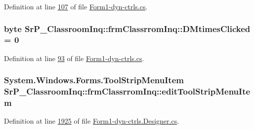 \-Definition at line \hyperlink{_form1-dyn-ctrls_8cs_source_l00107}{107} of file \hyperlink{_form1-dyn-ctrls_8cs_source}{\-Form1-\/dyn-\/ctrls.\-cs}.

\hypertarget{class_sr_p___classroom_inq_1_1frm_classrrom_inq_a595a5c6942aa919d47de2b3e20f5f5bc}{
\subsubsection[{\-D\-Mtimes\-Clicked}]{\setlength{\rightskip}{0pt plus 5cm}byte {\bf \-Sr\-P\-\_\-\-Classroom\-Inq\-::frm\-Classrrom\-Inq\-::\-D\-Mtimes\-Clicked} = 0}}
\label{class_sr_p___classroom_inq_1_1frm_classrrom_inq_a595a5c6942aa919d47de2b3e20f5f5bc}


\-Definition at line \hyperlink{_form1-dyn-ctrls_8cs_source_l00093}{93} of file \hyperlink{_form1-dyn-ctrls_8cs_source}{\-Form1-\/dyn-\/ctrls.\-cs}.

\hypertarget{class_sr_p___classroom_inq_1_1frm_classrrom_inq_a3e1d074025f88cab6f1911c123de6abb}{
\subsubsection[{edit\-Tool\-Strip\-Menu\-Item}]{\setlength{\rightskip}{0pt plus 5cm}\-System.\-Windows.\-Forms.\-Tool\-Strip\-Menu\-Item {\bf \-Sr\-P\-\_\-\-Classroom\-Inq\-::frm\-Classrrom\-Inq\-::edit\-Tool\-Strip\-Menu\-Item}}}
\label{class_sr_p___classroom_inq_1_1frm_classrrom_inq_a3e1d074025f88cab6f1911c123de6abb}


\-Definition at line \hyperlink{_form1-dyn-ctrls_8_designer_8cs_source_l01925}{1925} of file \hyperlink{_form1-dyn-ctrls_8_designer_8cs_source}{\-Form1-\/dyn-\/ctrls.\-Designer.\-cs}.

